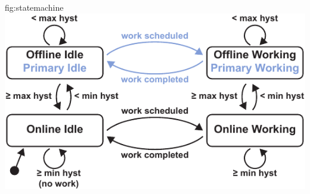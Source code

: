 \begin{definefigure}{fig:statemachine}
    \centering
    \includegraphics[width=\columnwidth]{figs/capacity/model_state_machine}
    \caption{\normalfont Model state machine.
    A modeled device can be in one of four states: \textsf{Offline Idle},
    \textsf{Online Idle}, \textsf{Online Working}, and \textsf{Offline
    Working}. When a device is \textsf{Offline Idle}, it has run out of energy
    and is off. If a device is \textsf{Online
    Idle}, it is on and in deep sleep, ready to perform work if triggered. If
    triggered, a device moves to \textsf{Online Working}, where it performs a
    portion of a work event.  If a workload is atomic, workload events
    \textit{must} be completed in one \textsf{Online Working} step, without any
    transitions to an offline state.  \textsf{Offline Working} means that while
    working on a non-atomic task, the device ran out of energy, checkpointed,
    and is waiting to harvest more and resume its task.  For devices
    configured with a primary-cell, \textsf{Offline Idle} and \textsf{Offline
    Working} become \textsf{\textcolor{primary-blue}{Primary Idle}} and
    \textsf{\textcolor{primary-blue}{Primary Working}} respectively.  In these
    states, outgoing energy is charged against the primary-cell and the device
    remains online and able to perform work for the life of the primary-cell.
    }
\end{definefigure}

